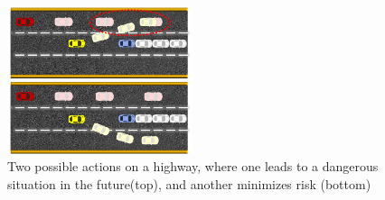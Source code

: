 \documentclass[letterpaper, 10 pt, conference]{ieeeconf}  %
\newcommand\NB[1]{$\spadesuit$\footnote{NB: #1}}
\begin{document}


\begin{figure}[ht]
    \includegraphics[width=0.48\textwidth]{fig/highway.png}
    \caption{Two possible actions on a highway, where one leads to a dangerous situation in the future(top), and another minimizes risk (bottom)}
    \label{fig:hiway}
\end{figure}
    
\end{document}
